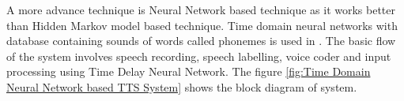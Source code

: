 

A more advance technique is Neural Network based technique as it works better than Hidden
Markov model based technique. Time domain neural networks with
database containing sounds of words called phonemes is used in \cite{karaali1998text}. The basic flow of the system involves
speech recording, speech labelling, voice coder and input processing using Time Delay Neural
Network. The figure \ref{fig:Time Domain Neural Network based TTS System} shows the block diagram of system.

